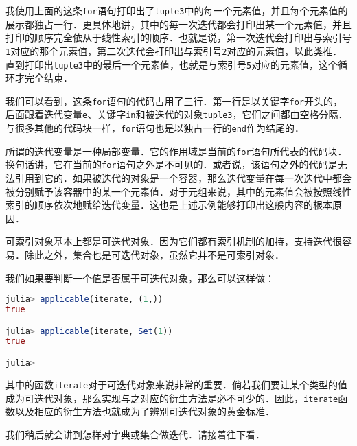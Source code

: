 我使用上面的这条\verb|for|语句打印出了\verb|tuple3|中的每一个元素值，并且每个元素值的展示都独占一行．更具体地讲，其中的每一次迭代都会打印出某一个元素值，并且打印的顺序完全依从于线性索引的顺序．也就是说，第一次迭代会打印出与索引号\verb|1|对应的那个元素值，第二次迭代会打印出与索引号\verb|2|对应的元素值，以此类推．直到打印出\verb|tuple3|中的最后一个元素值，也就是与索引号\verb|5|对应的元素值，这个循环才完全结束．

我们可以看到，这条\verb|for|语句的代码占用了三行．第一行是以关键字\verb|for|开头的，后面跟着迭代变量\verb|e|、关键字\verb|in|和被迭代的对象\verb|tuple3|，它们之间都由空格分隔．与很多其他的代码块一样，\verb|for|语句也是以独占一行的\verb|end|作为结尾的．

所谓的迭代变量是一种局部变量．它的作用域是当前的\verb|for|语句所代表的代码块．换句话讲，它在当前的\verb|for|语句之外是不可见的．或者说，该语句之外的代码是无法引用到它的．如果被迭代的对象是一个容器，那么迭代变量在每一次迭代中都会被分别赋予该容器中的某一个元素值．对于元组来说，其中的元素值会被按照线性索引的顺序依次地赋给迭代变量．这也是上述示例能够打印出这般内容的根本原因．

可索引对象基本上都是可迭代对象．因为它们都有索引机制的加持，支持迭代很容易．除此之外，集合也是可迭代对象，虽然它并不是可索引对象．

我们如果要判断一个值是否属于可迭代对象，那么可以这样做：
\begin{lstlisting}[language=julia]
julia> applicable(iterate, (1,))
true

julia> applicable(iterate, Set(1))
true

julia> 
\end{lstlisting}

其中的函数\verb|iterate|对于可迭代对象来说非常的重要．倘若我们要让某个类型的值成为可迭代对象，那么实现与之对应的衍生方法是必不可少的．因此，\verb|iterate|函数以及相应的衍生方法也就成为了辨别可迭代对象的黄金标准．

我们稍后就会讲到怎样对字典或集合做迭代．请接着往下看．